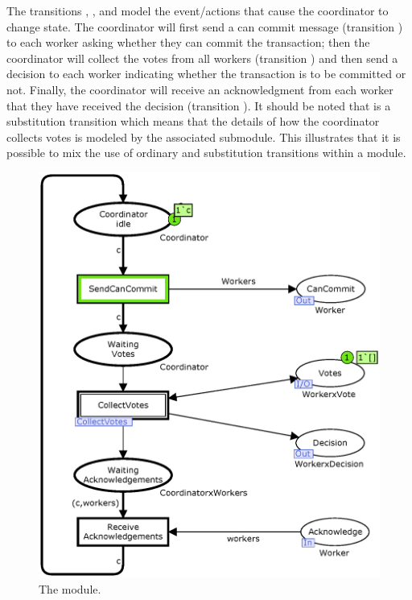 The transitions , , and
 model the event/actions that cause the
coordinator to change state. The coordinator will first send a can
commit message (transition ) to each worker
asking whether they can commit the transaction; then the coordinator
will collect the votes from all workers (transition
) and then send a decision to each worker
indicating whether the transaction is to be committed or not. Finally,
the coordinator will receive an acknowledgment from each worker that
they have received the decision (transition
).  It should be noted that
 is a substitution transition which means that
the details of how the coordinator collects votes is modeled by the
associated  submodule. This illustrates that it
is possible to mix the use of ordinary and substitution transitions
within a module.

\begin{figure}[]
\centering
\includegraphics[scale=.5]{figures/Coordinator.eps}
\caption{The  module.}
\label{fig:coordinator}
\end{figure}


